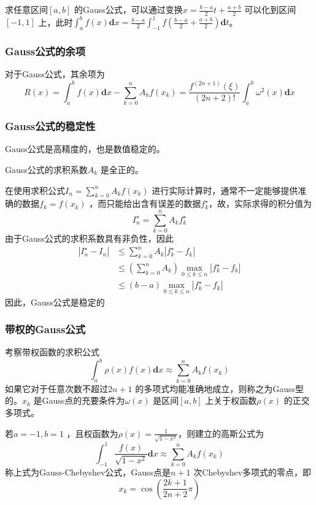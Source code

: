 \documentclass[a4paper]{article}
\begin{document}
求任意区间$[a,b]$ 的Gauss公式，可以通过变换$x = \frac{b - a}{2} t + \frac{a + b}{2}$ 可以化到区间$[-1,1]$ 上，此时$\int_{a}^{b} f(x) \mathbf{d} x = \frac{b - a}{2} \int_{-1}^{1} f(\frac{b - a}{2} + \frac{a + b}{2}) \mathbf{d} t $。

\subsubsection{Gauss公式的余项}
\begin{theorem}
	对于Gauss公式，其余项为
	\[
	R(x) = \int_{a}^{b} f(x) \mathbf{d} x - \sum_{k=0}^{n} A_k f(x_{k}) = \frac{f^{(2n+1)}(\xi)}{(2n+2)!} \int_{a}^{b} \omega^2(x) \mathbf{d} x \tag{3.4.3} \label{eq:3.4.3} 
	\] 
\end{theorem}

\subsubsection{Gauss公式的稳定性}
Gauss公式是高精度的，也是数值稳定的。

\begin{theorem}
	Gauss公式的求积系数$A_k$ 是全正的。
\end{theorem}

在使用求积公式$I_n = \sum_{k=0}^{n} A_k f(x_{k})$ 进行实际计算时，通常不一定能够提供准确的数据$f_k = f(x_{k})$ ，而只能给出含有误差的数据$f_k^{\star}$，故，实际求得的积分值为
\[
I_n^{\star} = \sum_{k=0}^{n} A_k f_k^{\star}
\] 
由于Gauss公式的求积系数具有非负性，因此
\[
	\begin{align*}
		| I_n^{\star} - I_n | &\le \sum_{k=0}^{n} A_k | f_k^{\star} - f_k| \\
				      &\le (\sum_{k=0}^{n} A_k) \max_{0 \le k \le n} |f_k^{\star} - f_k| \\
				      & \le (b-a) \max_{0 \le k \le n} |f_k^{\star} - f_k|
        \end{align*}
\] 
因此，Gauss公式是稳定的
\subsubsection{带权的Gauss公式}
考察带权函数的求积公式
\[
\int_{a}^{b} \rho(x) f(x) \mathbf{d} x \approx \sum_{k=0}^{n} A_k f(x_{k}) 
\] 
如果它对于任意次数不超过$2n+1$ 的多项式均能准确地成立，则称之为Gauss型的。$x_{k}$ 是Gauss点的充要条件为$\omega(x)$ 是区间$[a,b]$ 上关于权函数$\rho(x)$ 的正交多项式。

若$a=-1, b=1$ ，且权函数为$\rho(x) = \frac{1}{\sqrt{1 - x^2} }$，则建立的高斯公式为 
\[
	\int_{-1}^{1} \frac{f(x)}{\sqrt{1 - x^2} } \mathbf{d} x \approx \sum_{k=0}^{n} A_k f(x_{k}) \tag{3.4.4} \label{eq:3.4.4} 
\] 
称上式为Gauss-Chebyshev公式，Gauss点是$n+1$ 次Chebyshev多项式的零点，即
\[
x_{k} = \cos \left( \frac{2k+1}{2n+2} \pi \right) 
\] 
\end{document}
